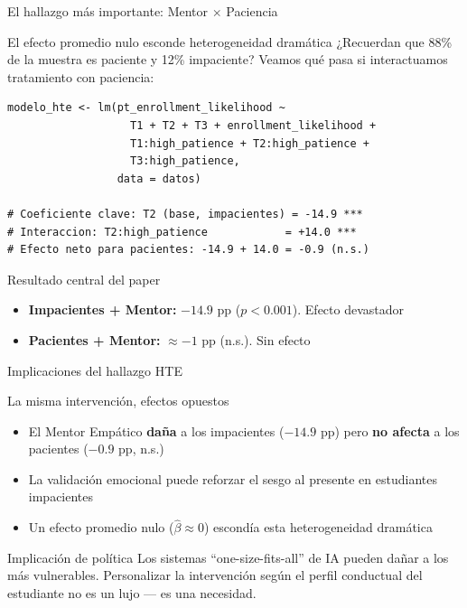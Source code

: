 \documentclass[aspectratio=169, 11pt]{beamer}
\begin{document}
\begin{frame}[fragile]{El hallazgo más importante: Mentor $\times$ Paciencia}
\begin{block}{El efecto promedio nulo esconde heterogeneidad dramática}
\small
¿Recuerdan que 88\% de la muestra es paciente y 12\% impaciente? Veamos qué pasa si interactuamos tratamiento con paciencia:
\end{block}

\begin{lstlisting}[basicstyle=\ttfamily\scriptsize]
modelo_hte <- lm(pt_enrollment_likelihood ~
                   T1 + T2 + T3 + enrollment_likelihood +
                   T1:high_patience + T2:high_patience +
                   T3:high_patience,
                 data = datos)

# Coeficiente clave: T2 (base, impacientes) = -14.9 ***
# Interaccion: T2:high_patience            = +14.0 ***
# Efecto neto para pacientes: -14.9 + 14.0 = -0.9 (n.s.)
\end{lstlisting}

\vspace{0.1cm}
\begin{alertblock}{Resultado central del paper}
\small
\begin{itemize}\setlength{\itemsep}{1pt}
  \item \textbf{Impacientes + Mentor:} $-14.9$ pp ($p < 0.001$). Efecto devastador
  \item \textbf{Pacientes + Mentor:} $\approx -1$ pp (n.s.). Sin efecto
\end{itemize}
\end{alertblock}
\end{frame}

\begin{frame}{Implicaciones del hallazgo HTE}
\begin{block}{La misma intervención, efectos opuestos}
\small
\begin{itemize}\setlength{\itemsep}{4pt}
  \item El Mentor Empático \textbf{daña} a los impacientes ($-14.9$ pp) pero \textbf{no afecta} a los pacientes ($-0.9$ pp, n.s.)
  \item La validación emocional puede reforzar el sesgo al presente en estudiantes impacientes
  \item Un efecto promedio nulo ($\hat{\beta} \approx 0$) escondía esta heterogeneidad dramática
\end{itemize}
\end{block}

\vspace{0.3cm}
\begin{alertblock}{Implicación de política}
Los sistemas ``one-size-fits-all'' de IA pueden dañar a los más vulnerables. Personalizar la intervención según el perfil conductual del estudiante no es un lujo --- es una necesidad.
\end{alertblock}
\end{frame}
\end{document}
